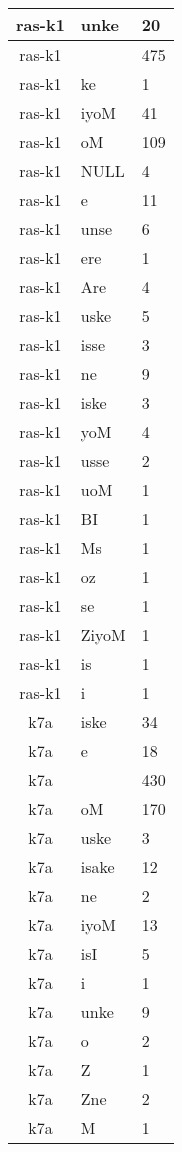\documentclass[a4 paper]{article}
\begin{document}
\begin{longtable}{cp{}p{}}
ras-k1 & unke & 20\\ \midrule ras-k1 &  & 475\\ \midrule ras-k1 & ke & 1\\ \midrule ras-k1 & iyoM & 41\\ \midrule ras-k1 & oM & 109\\ \midrule ras-k1 & NULL & 4\\ \midrule ras-k1 & e & 11\\ \midrule ras-k1 & unse & 6\\ \midrule ras-k1 & ere & 1\\ \midrule ras-k1 & Are & 4\\ \midrule ras-k1 & uske & 5\\ \midrule ras-k1 & isse & 3\\ \midrule ras-k1 & ne & 9\\ \midrule ras-k1 & iske & 3\\ \midrule ras-k1 & yoM & 4\\ \midrule ras-k1 & usse & 2\\ \midrule ras-k1 & uoM & 1\\ \midrule ras-k1 & BI & 1\\ \midrule ras-k1 & Ms & 1\\ \midrule ras-k1 & oz & 1\\ \midrule ras-k1 & se & 1\\ \midrule ras-k1 & ZiyoM & 1\\ \midrule ras-k1 & is & 1\\ \midrule ras-k1 & i & 1\\ \midrule 
k7a & iske & 34\\ \midrule k7a & e & 18\\ \midrule k7a &  & 430\\ \midrule k7a & oM & 170\\ \midrule k7a & uske & 3\\ \midrule k7a & isake & 12\\ \midrule k7a & ne & 2\\ \midrule k7a & iyoM & 13\\ \midrule k7a & isI & 5\\ \midrule k7a & i & 1\\ \midrule k7a & unke & 9\\ \midrule k7a & o & 2\\ \midrule k7a & Z & 1\\ \midrule k7a & Zne & 2\\ \midrule k7a & M & 1\\ \midrule 

\end{longtable}
\end{document}
